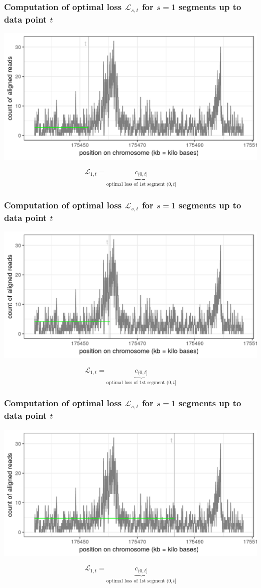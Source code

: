 
\begin{frame}
\frametitle{Computation of optimal loss $\mathcal L_{s, t}$
  for $s=1$ segments up to data point $t$}
  \includegraphics[width=\textwidth]{figure-dp-first-1.png}

$$
\mathcal L_{1, t} =
\underbrace{
  c_{(0, t]}
}_{
  \text{optimal loss of 1st segment $(0, t]$}
}
$$

\end{frame}
 
\begin{frame}
\frametitle{Computation of optimal loss $\mathcal L_{s, t}$
  for $s=1$ segments up to data point $t$}
  \includegraphics[width=\textwidth]{figure-dp-first-2.png}

$$
\mathcal L_{1, t} =
\underbrace{
  c_{(0, t]}
}_{
  \text{optimal loss of 1st segment $(0, t]$}
}
$$

\end{frame}
 
\begin{frame}
\frametitle{Computation of optimal loss $\mathcal L_{s, t}$
  for $s=1$ segments up to data point $t$}
  \includegraphics[width=\textwidth]{figure-dp-first-3.png}

$$
\mathcal L_{1, t} =
\underbrace{
  c_{(0, t]}
}_{
  \text{optimal loss of 1st segment $(0, t]$}
}
$$

\end{frame}
